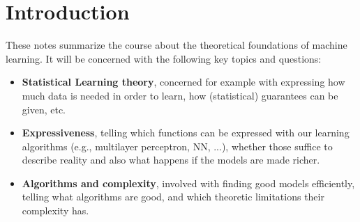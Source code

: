 \section*{Introduction}
These notes summarize the course about the theoretical foundations of machine learning. It will be concerned with the following key topics and questions:
\begin{itemize}
  \item \textbf{Statistical Learning theory}, concerned for example with expressing how much data is needed in order to learn, how (statistical) guarantees can be given, etc.
  \item \textbf{Expressiveness}, telling which functions can be expressed with our learning algorithms (e.g., multilayer perceptron, NN, ...), whether those suffice to describe reality and also what happens if the models are made richer.
  \item \textbf{Algorithms and complexity}, involved with finding good models efficiently, telling what algorithms are good, and which theoretic limitations their complexity has.
\end{itemize}

